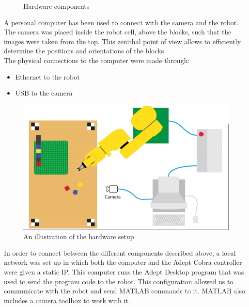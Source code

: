 \begin{figure}[H]
{		\label{fig:cobra}}
	\caption{Hardware components}
\end{figure}

A personal computer has been used to connect with the camera and the robot. The camera was placed inside the robot cell, above the blocks, such that the images were taken from the top. This zenithal point of view allows to efficiently determine the positions and orientations of the blocks. 
\\

The physical connections to the computer were made through: 
\begin{itemize}
	\item Ethernet to the robot  
	\item USB to the camera 
\end{itemize}

\begin{figure}[H]
	\centering
	\includegraphics[scale=0.4]{figures/robotCellDesign.png}
	\caption{An illustration of the hardware setup}
\end{figure}

In order to connect between the different components described above, a local network was set up in which both the computer and the Adept Cobra controller were given a static IP. This computer runs the Adept Desktop program that was used to send the program code to the robot. This configuration allowed us to communicate with the robot and send MATLAB commands to it. MATLAB also includes a camera toolbox to work with it. 

